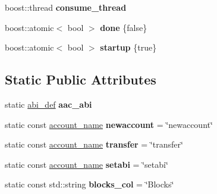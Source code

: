 \begin{DoxyCompactItemize}
boost\+::thread {\bfseries consume\+\_\+thread}
\item 
\mbox{\label{classaacio_1_1mongo__db__plugin__impl_acfbd27ccadca788e0892832f6b4a7cb6}} 
boost\+::atomic$<$ bool $>$ {\bfseries done} \{false\}
\item 
\mbox{\label{classaacio_1_1mongo__db__plugin__impl_a9f9df226ec8a8c956057eac8cfb780db}} 
boost\+::atomic$<$ bool $>$ {\bfseries startup} \{true\}
\end{DoxyCompactItemize}
\subsection*{Static Public Attributes}
\begin{DoxyCompactItemize}
\item 
\mbox{\label{classaacio_1_1mongo__db__plugin__impl_a2c893353a25d846e5cb1d8f8dc5b2ff6}} 
static \mbox{\hyperlink{structaacio_1_1chain_1_1contracts_1_1abi__def}{abi\+\_\+def}} {\bfseries aac\+\_\+abi}
\item 
\mbox{\label{classaacio_1_1mongo__db__plugin__impl_a6da091efc5bfb8c88cb110e80b837dbc}} 
static const \mbox{\hyperlink{structaacio_1_1chain_1_1name}{account\+\_\+name}} {\bfseries newaccount} = \char`\"{}newaccount\char`\"{}
\item 
\mbox{\label{classaacio_1_1mongo__db__plugin__impl_a5b30b3346ec33af1dc819774e440c575}} 
static const \mbox{\hyperlink{structaacio_1_1chain_1_1name}{account\+\_\+name}} {\bfseries transfer} = \char`\"{}transfer\char`\"{}
\item 
\mbox{\label{classaacio_1_1mongo__db__plugin__impl_a066e66d9b1c371cae0f0840355864e2f}} 
static const \mbox{\hyperlink{structaacio_1_1chain_1_1name}{account\+\_\+name}} {\bfseries setabi} = \char`\"{}setabi\char`\"{}
\item 
\mbox{\label{classaacio_1_1mongo__db__plugin__impl_a83f3acc0dd305c23a49bcedd94d11727}} 
static const std\+::string {\bfseries blocks\+\_\+col} = \char`\"{}Blocks\char`\"{}

\end{DoxyCompactItemize}
